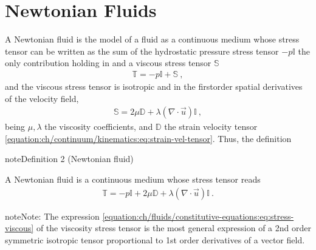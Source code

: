 \documentclass[letterpaper,10pt,english]{jupyterBook}
\begin{document}
\section{Newtonian Fluids}
\label{\detokenize{ch/fluids/constitutive-equations:newtonian-fluids}}\label{\detokenize{ch/fluids/constitutive-equations:fluid-mechanics-constutive-equations-newtonian}}
\sphinxAtStartPar
A Newtonian fluid is the model of a fluid as a continuous medium whose stress tensor can be written as the sum of the hydrostatic pressure stress tensor \(-p \mathbb{I}\) \sphinxhyphen{} the only contribution holding in {\hyperref[\detokenize{ch/fluids/statics:fluid-mechanics-statics}]{}} \sphinxhyphen{} and a viscous stress tensor \(\mathbb{S}\)
\begin{equation*}
\begin{split}\mathbb{T} = -p \mathbb{I} + \mathbb{S} \ ,\end{split}
\end{equation*}
\sphinxAtStartPar
and the viscous stress tensor is isotropic and  in the first\sphinxhyphen{}order spatial derivatives of the velocity field,
\begin{equation}\label{equation:ch/fluids/constitutive-equations:eq:stress-viscous}
\begin{split}\mathbb{S} = 2 \mu \mathbb{D} + \lambda (\nabla \cdot \vec{u}) \mathbb{I} \ ,\end{split}
\end{equation}
\sphinxAtStartPar
being \(\mu, \lambda\) the viscosity coefficients, and \(\mathbb{D}\) the strain velocity tensor \eqref{equation:ch/continuum/kinematics:eq:strain-vel-tensor}. Thus, the definition
\label{ch/fluids/constitutive-equations:definition-0}
\begin{sphinxadmonition}{note}{Definition 2 (Newtonian fluid)}



\sphinxAtStartPar
A Newtonian fluid is a continuous medium whose stress tensor reads
\begin{equation}\label{equation:ch/fluids/constitutive-equations:eq:stress-newtonian}
\begin{split}\mathbb{T} = - p \mathbb{I} + 2 \mu \mathbb{D} + \lambda (\nabla \cdot \vec{u}) \mathbb{I} \ .\end{split}
\end{equation}\end{sphinxadmonition}

\begin{sphinxadmonition}{note}{Note:}
\sphinxAtStartPar
The expression \eqref{equation:ch/fluids/constitutive-equations:eq:stress-viscous} of the viscosity stress tensor is the most general expression of a 2\sphinxhyphen{}nd order symmetric isotropic tensor proportional to 1\sphinxhyphen{}st order derivatives of a vector field.
\end{sphinxadmonition}
\end{document}
